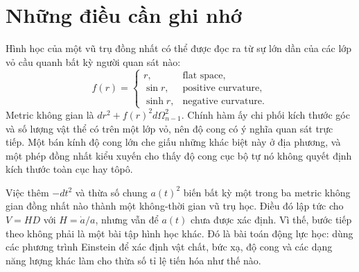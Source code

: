 \section{Những điều cần ghi nhớ}

Hình học của một vũ trụ đồng nhất có thể được đọc ra từ sự lớn dần của các lớp vỏ cầu quanh bất kỳ người quan sát nào:
\begin{equation}
f(r)=
\begin{cases}
r, & \text{flat space},\\
\sin r, & \text{positive curvature},\\
\sinh r, & \text{negative curvature}.
\end{cases}
\end{equation}
Metric không gian là \(dr^2+f(r)^2d\Omega_{n-1}^2\). Chính hàm ấy chi phối kích thước góc và số lượng vật thể có trên một lớp vỏ, nên độ cong có ý nghĩa quan sát trực tiếp. Một bán kính độ cong lớn che giấu những khác biệt này ở địa phương, và một phép đồng nhất kiểu xuyến cho thấy độ cong cục bộ tự nó không quyết định kích thước toàn cục hay tôpô.

Việc thêm \(-dt^2\) và thừa số chung \(a(t)^2\) biến bất kỳ một trong ba metric không gian đồng nhất nào thành một không-thời gian vũ trụ học. Điều đó lập tức cho \(V=HD\) với \(H=\dot a/a\), nhưng vẫn để \(a(t)\) chưa được xác định. Vì thế, bước tiếp theo không phải là một bài tập hình học khác. Đó là bài toán động lực học: dùng các phương trình Einstein để xác định vật chất, bức xạ, độ cong và các dạng năng lượng khác làm cho thừa số tỉ lệ tiến hóa như thế nào.
